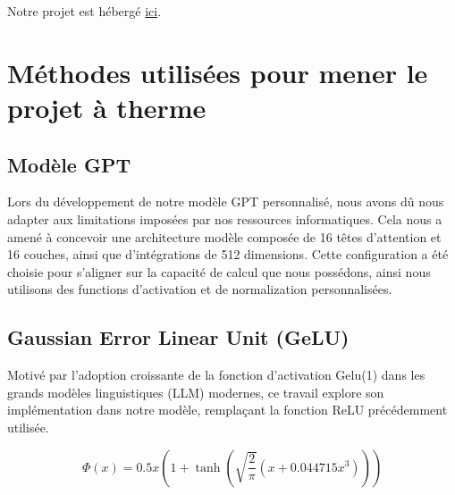 \documentclass{rapport}
\begin{document}
        Notre projet est hébergé \href{https://github.com/extremety1989/tatia/tree/main}{ici}.

    \clearpage

    \section{Méthodes utilisées pour mener le projet à therme}
        \subsection{Modèle GPT}

            Lors du développement de notre modèle GPT personnalisé, nous avons dû nous adapter aux limitations imposées par nos ressources informatiques. Cela nous a amené à concevoir une architecture modèle composée de 16 têtes d’attention et 16 couches, ainsi que d’intégrations de 512 dimensions. Cette configuration a été choisie pour s'aligner sur la capacité de calcul que nous possédons, ainsi nous utilisons des functions d'activation et de normalization personnalisées.

        \subsection{Gaussian Error Linear Unit (GeLU)}
            
            Motivé par l'adoption croissante de la fonction d'activation Gelu(1) dans les grands modèles linguistiques (LLM) modernes, ce travail explore son implémentation dans notre modèle, remplaçant la fonction ReLU précédemment utilisée.
            
            
            \begin{equation}
                \Phi(x) = 0.5x \left( 1 + \tanh \left( \sqrt{\frac{2}{\pi}} \left( x + 0.044715x^3 \right) \right) \right)
            \end{equation}
            
\end{document}
